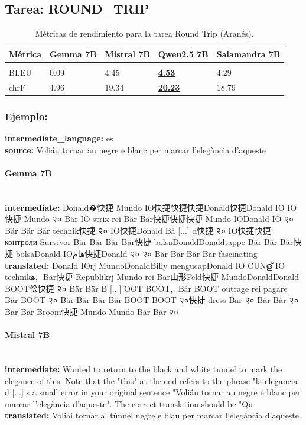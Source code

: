 \subsection{Tarea: ROUND\_TRIP}\label{tarea-round_trip}
\begin{longtable}[]{@{}lllll@{}}
\toprule\noalign{}
Métrica & Gemma 7B & Mistral 7B & Qwen2.5 7B & Salamandra 7B \\
\midrule\noalign{}
\endhead
\bottomrule\noalign{}
\caption{Métricas de rendimiento para la tarea Round Trip (Aranés).}
\label{tab:metricas_round_trip_Aranés}\\
\endlastfoot
BLEU & 0.09 & 4.45 & \textbf{\underline{4.53}} & 4.29 \\
chrF & 4.96 & 19.34 & \textbf{\underline{20.23}} & 18.79 \\
\end{longtable}

\subsubsection{Ejemplo:}
\textbf{intermediate\_language:} es\\
\textbf{source:} Voliáu tornar au negre e blanc per marcar l’elegància d’aqueste

\paragraph{Gemma 7B}~\\
\textbf{intermediate:} Donald�快捷 Mundo IO快捷快捷快捷Donald快捷Donald IO IO快捷 Mundo २० Bär IO strix rei Bär Bär快捷快捷快捷 Mundo IODonald IO २० Bär Bär Bär technik快捷 २० IO快捷Donald Bä [...] d快捷 २० IO快捷快捷 контроли Survivor Bär Bär Bär Bär快捷 bolsaDonaldDonaldtappe Bär Bär Bär快捷 bolsaDonald IOهام快捷Donald २० २० Bär Bär Bär Bär fascinating\\
\textbf{translated:} Donald IOrj MundoDonaldBilly mengucapDonald IO CUNള് IO technikﻫ,\,\ Bär快捷 Republikrj Mundo rei Bär山形Feld快捷 MundoDonaldDonald BOOT伀快捷 २० Bär Bär B [...] OOT BOOT,\,\ Bär BOOT outrage rei pagare Bär BOOT २० Bär Bär Bär Bär BOOT BOOT २०快捷 dress Bär २० Bär Bär २० Bär Bär Broom快捷 Mundo Mundo Bär Bär २०

\paragraph{Mistral 7B}~\\
\textbf{intermediate:} Wanted to return to the black and white tunnel to mark the elegance of this.  Note that the "this" at the end refers to the phrase "la elegancia d [...] s a small error in your original sentence "Voliáu tornar au negre e blanc per marcar l’elegància d’aqueste". The correct translation should be "Qu\\
\textbf{translated:} Voliai tornar al túnnel negre e blau per marcar l’elegáncia d’aqueste.

